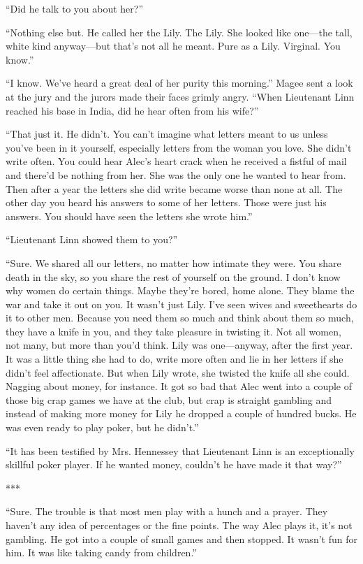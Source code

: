 \documentclass{novel}
\begin{document}
“Did he talk to you about her?”

“Nothing else but. He called her the Lily. The Lily. She looked like one—the tall, white kind anyway—but that’s not all he meant. Pure as a Lily. Virginal. You know.”

“I know. We’ve heard a great deal of her purity this morning.” Magee sent a look at the jury and the jurors made their faces grimly angry. “When Lieutenant Linn reached his base in India, did he hear often from his wife?”

“That just it. He didn’t. You can’t imagine what letters meant to us unless you’ve been in it yourself, especially letters from the woman you love. She didn’t write often. You could hear Alec’s heart crack when he received a fistful of mail and there’d be nothing from her. She was the only one he wanted to hear from. Then after a year the letters she did write became worse than none at all. The other day you heard his answers to some of her letters. Those were just his answers. You should have seen the letters she wrote him.”

“Lieutenant Linn showed them to you?”

“Sure. We shared all our letters, no matter how intimate they were. You share death in the sky, so you share the rest of yourself on the ground. I don’t know why women do certain things. Maybe they’re bored, home alone. They blame the war and take it out on you. It wasn’t just Lily. I’ve seen wives and sweethearts do it to other men. Because you need them so much and think about them so much, they have a knife in you, and they take pleasure in twisting it. Not all women, not many, but more than you’d think. Lily was one—anyway, after the first year. It was a little thing she had to do, write more often and lie in her letters if she didn’t feel affectionate. But when Lily wrote, she twisted the knife all she could. Nagging about money, for instance. It got so bad that Alec went into a couple of those big crap games we have at the club, but crap is straight gambling and instead of making more money for Lily he dropped a couple of hundred bucks. He was even ready to play poker, but he didn’t.”

“It has been testified by Mrs. Hennessey that Lieutenant Linn is an exceptionally skillful poker player. If he wanted money, couldn’t he have made it that way?”

***

“Sure. The trouble is that most men play with a hunch and a prayer. They haven’t any idea of percentages or the fine points. The way Alec plays it, it’s not gambling. He got into a couple of small games and then stopped. It wasn’t fun for him. It was like taking candy from children.”
\end{document}
